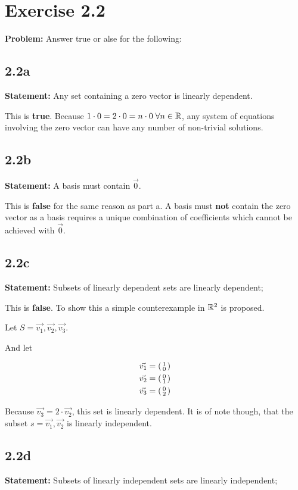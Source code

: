 \section*{Exercise 2.2}
\textbf{Problem:} Answer true or alse for the following:

\subsection*{2.2a} \textbf{Statement:} Any set containing a zero vector is linearly dependent.

This is \textbf{true}. Because $1 \cdot 0 = 2 \cdot 0 = n \cdot 0 \; \forall n \in \mathbb{R}$, any system of equations involving the zero vector can have any number of non-trivial solutions.  

\subsection*{2.2b} \textbf{Statement:} A basis must contain $\vec{0}$.

This is \textbf{false} for the same reason as part a. A basis must \textbf{not} contain the zero vector as a basis requires a unique combination of coefficients which cannot be achieved with $\vec{0}$. 
\subsection*{2.2c} \textbf{Statement:} Subsets of linearly dependent sets are linearly dependent;

This is \textbf{false}. To show this a simple counterexample in $\mathbb{R}^{2}$ is proposed. 

Let $S = \vec{v_{1}}, \vec{v_{2}}, \vec{v_{3}}$. 

And let 

\[
	\begin{aligned}
		\vec{v_{1}} &= \left(\begin{smallmatrix} 1 \\ 0 \end{smallmatrix} \right) \\
		\vec{v_{2}} &= \left(\begin{smallmatrix} 0 \\ 1 \end{smallmatrix} \right) \\
		\vec{v_{3}} &= \left(\begin{smallmatrix} 0 \\ 2 \end{smallmatrix} \right)
	\end{aligned}
\]

Because $\vec{v_{3}} = 2 \cdot \vec{v_{2}}$, this set is linearly dependent. It is of note though, that the subset $s = \vec{v_{1}}, \vec{v_{2}}$ is linearly independent. 

\subsection*{2.2d} \textbf{Statement:} Subsets of linearly independent sets are linearly independent;

